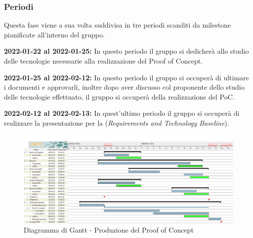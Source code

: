 \subsubsection{Periodi}

Questa fase viene a sua volta suddivisa in tre periodi scanditi da milestone pianificate all'interno del gruppo.

\textbf{2022-01-22 al 2022-01-25:} In questo periodo il gruppo si dedicherà allo studio delle tecnologie necessarie alla realizzazione del Proof of Concept.

\textbf{2022-01-25 al 2022-02-12:} In questo periodo il gruppo si occuperà di ultimare i documenti e approvarli, inoltre dopo aver discusso col proponente dello studio delle tecnologie effettuato, il gruppo si occuperà della realizzazione del PoC.

\textbf{2022-02-12 al 2022-02-13:} In quest'ultimo periodo il gruppo si occuperà di realizzare la presentazione per la (\textit{Requirements and Technology Baseline}).


\begin{figure}[H]
    \centering
    \includegraphics[scale=0.30]{Sezioni/gantt/TB.png}
    \caption{Diagramma di Gantt - Produzione del Proof of Concept}
\end{figure}